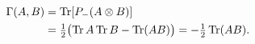 \setcounter{equation}{39}
\begin{align}
\Gamma(A,B)&=\operatorname{Tr}[P_-(A\otimes B)]\\
&=\tfrac12\bigl(\operatorname{Tr} A\operatorname{Tr} B-\operatorname{Tr}(AB)\bigr)
=-\tfrac12\operatorname{Tr}(AB).
\label{eq:singletcontraction}
\end{align}
